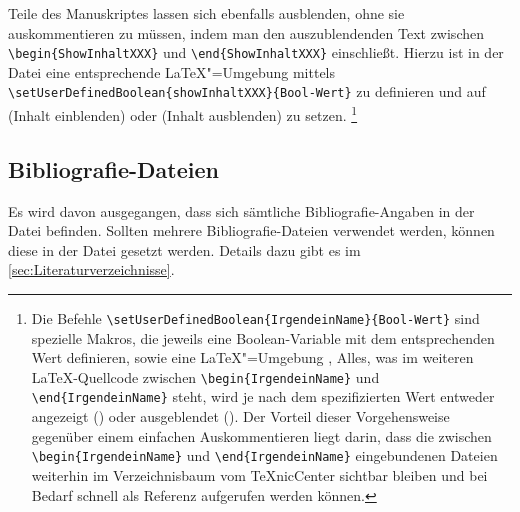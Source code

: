 Teile des Manuskriptes lassen sich ebenfalls ausblenden, ohne sie auskommentieren zu müssen,
indem man den auszublendenden Text zwischen
\lstinline|\begin{ShowInhaltXXX}| und \lstinline|\end{ShowInhaltXXX}| einschließt.
Hierzu ist in der Datei 
eine entsprechende \LaTeX{}"=Umgebung mittels
\lstinline|\setUserDefinedBoolean{showInhaltXXX}{Bool-Wert}| zu definieren und
auf  (Inhalt einblenden) 
oder  (Inhalt ausblenden) zu setzen.%
%
\footnote{Die Befehle
\lstinline|\setUserDefinedBoolean{IrgendeinName}{Bool-Wert}| 
sind spezielle Makros, die jeweils eine Boolean-Variable mit dem entsprechenden Wert definieren,
sowie eine \LaTeX"=Umgebung ,
Alles, was im weiteren \LaTeX-Quellcode zwischen
\lstinline|\begin{IrgendeinName}| und \lstinline|\end{IrgendeinName}| steht,
wird je nach dem spezifizierten Wert entweder angezeigt () 
oder ausgeblendet ().
Der Vorteil dieser Vorgehensweise gegenüber einem einfachen Auskommentieren 
liegt \ua darin, dass die zwischen
\lstinline|\begin{IrgendeinName}| und \lstinline|\end{IrgendeinName}|
eingebundenen Dateien weiterhin im Verzeichnisbaum vom TeXnicCenter \etc
sichtbar bleiben und bei Bedarf schnell als Referenz aufgerufen werden können.}



\subsection[Bibliografie-Dateien]{Bibliografie-Dateien}%
%
\label{sec:Bibliografie}
%
Es wird davon ausgegangen, dass sich sämtliche Bibliografie-Angaben in der Datei
 befinden.
Sollten mehrere Bibliografie-Dateien verwendet werden, können diese in der Datei
 gesetzt werden.
Details dazu gibt es im \cref{sec:Literaturverzeichnisse}.

